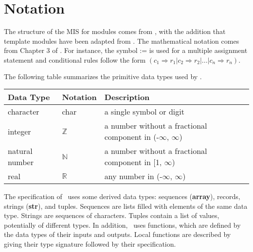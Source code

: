 \documentclass[12pt, titlepage]{article}
\begin{document}
\section{Notation}


The structure of the MIS for modules comes from \citet{HoffmanAndStrooper1995},
with the addition that template modules have been adapted from
\cite{GhezziEtAl2003}.  The mathematical notation comes from Chapter 3 of
\citet{HoffmanAndStrooper1995}.  For instance, the symbol := is used for a
multiple assignment statement and conditional rules follow the form $(c_1
\Rightarrow r_1 | c_2 \Rightarrow r_2 | ... | c_n \Rightarrow r_n )$.

The following table summarizes the primitive data types used by \progname. 

\begin{center}
\renewcommand{\arraystretch}{1.2}
\noindent 
\begin{tabular}{l l p{7.5cm}} 
\toprule 
\textbf{Data Type} & \textbf{Notation} & \textbf{Description}\\ 
\midrule
character & char & a single symbol or digit\\
integer & $\mathbb{Z}$ & a number without a fractional component in (-$\infty$, $\infty$) \\
natural number & $\mathbb{N}$ & a number without a fractional component in [1, $\infty$) \\
real & $\mathbb{R}$ & any number in (-$\infty$, $\infty$)\\
\bottomrule
\end{tabular} 
\end{center}

\noindent
The specification of \progname \ uses some derived data types: sequences (\textbf{array}), records, strings (\textbf{str}), and
tuples. Sequences are lists filled with elements of the same data type. Strings
are sequences of characters. Tuples contain a list of values, potentially of
different types. In addition, \progname \ uses functions, which
are defined by the data types of their inputs and outputs. Local functions are
described by giving their type signature followed by their specification.
\end{document}
